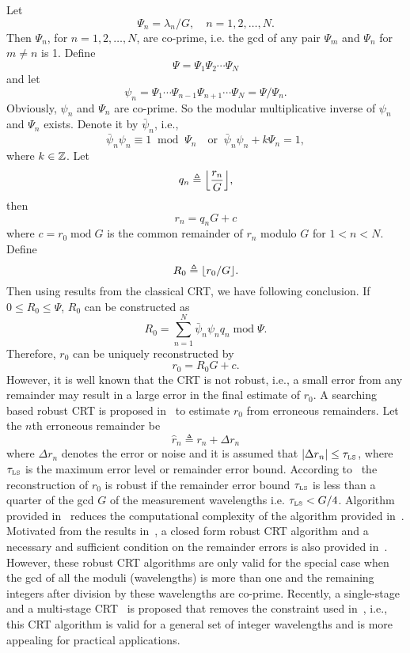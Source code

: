 Let
\[
\Psi_n = \lambda_n/G, \quad n=1,2,\ldots,N.
\]
Then $\Psi_n$, for $n=1,2,\ldots,N$, are co-prime, i.e. the gcd of any pair $\Psi_m$ and $\Psi_n$ for $m\neq n$ is 1. Define 
\[
\Psi = \Psi_1\Psi_2 \cdots \Psi_N
\]
and let
\[
\psi_n = \Psi_1 \cdots \Psi_{n-1} \Psi_{n+1} \cdots \Psi_N = \Psi/\Psi_n.
\]
Obviously, $\psi_n$ and $\Psi_n$ are co-prime. So the modular multiplicative inverse of $\psi_n$ and $\Psi_n$ exists. Denote it by $\bar{\psi}_n$, i.e., 
\[
\bar{\psi}_n \psi_n \equiv 1 \;\; \text{mod} \;\; \Psi_n  \quad \text{or} \;\; \bar{\psi}_n \psi_n + k\Psi_n =1, 
\]
where $k \in {\mathbb Z}$. Let 
\[
q_n \triangleq {\left\lfloor \frac{r_n}{G} \right\rfloor},
\] 
then
\[
r_n = q_n G + c
\]
where $c = r_0\; \text{mod}\; G$ is the common remainder of $r_n$ modulo $G$ for $1<n<N$. Define
\[
R_0  \triangleq {\left\lfloor r_0/G \right\rfloor}.
\]
Then using results from the classical CRT, we have following conclusion. If $0 \leq R_0 \leq \Psi$, $R_0$ can be constructed as
\[
R_0 = \sum_{n=1}^N \bar{\psi}_n \psi_n q_n \; \text{mod} \; \Psi.
\]
Therefore, $r_0$ can be uniquely reconstructed by
\[
r_0 = R_0G + c.
\]
However, it is well known that the CRT is not robust, i.e., a small error from any remainder may result in a large error in the final estimate of $r_0$. A searching based robust CRT is proposed in~\cite{XiaoweiLi2010, Xia2007} to estimate $r_0$ from erroneous remainders. Let the $n$th erroneous remainder be
\[
\hat{r}_n \triangleq r_n + \Delta r_n 
\]
where $\Delta r_n$ denotes the error or noise and it is assumed that $|\Delta r_n | \leq \tau_{\text{\tiny{LS}}}$, where $\tau_{\text{\tiny{LS}}}$ is the maximum error level or remainder error bound. According to~\cite{Xia2007} the reconstruction of $r_0$ is robust if the remainder error bound $\tau_{\text{\tiny{LS}}}$ is less than a quarter of the gcd $G$ of the measurement wavelengths i.e. $\tau_{\text{\tiny{LS}}} < G/4$. Algorithm provided in~\cite{Xiaowei_Li_robust_CRT_2009} reduces the computational complexity of the algorithm provided in~\cite{Xia2007}. Motivated from the results in~\cite{Xia2007, Xiaowei_Li_robust_CRT_2009}, a closed form robust CRT algorithm and a necessary and sufficient condition on the remainder errors is also provided in~\cite{W.Wang_closed_form_crt_2010}. However, these robust CRT algorithms are only valid for the special case when the gcd of all the moduli (wavelengths) is more than one and the remaining integers after division by these wavelengths are co-prime. Recently, a single-stage and a multi-stage CRT~\cite{Xiao_multistage_crt_2014} is proposed that removes the constraint used in~\cite{Xia2007, Xiaowei_Li_robust_CRT_2009, W.Wang_closed_form_crt_2010}, i.e., this CRT algorithm is valid for a general set of integer wavelengths and is more appealing for practical applications. 





